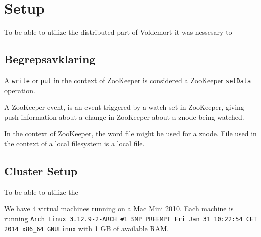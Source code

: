 \clearpage

\section{Setup}
\label{sec:setup}

To be able to utilize the distributed part of Voldemort it was nessesary to 

\subsection{Begrepsavklaring}
A \texttt{write} or \texttt{put} in the context of ZooKeeper is considered a ZooKeeper \texttt{setData} operation.

A ZooKeeper event, is an event triggered by a watch set in ZooKeeper, giving push information about a change in ZooKeeper about a znode being watched.

In the context of ZooKeeper, the word file might be used for a znode. File used in the context of a local filesystem is a local file.

\subsection{Cluster Setup}
To be able to utilize the 


We have 4 virtual machines running on a Mac Mini 2010. Each machine is running \texttt{Arch Linux 3.12.9-2-ARCH \#1 SMP PREEMPT Fri Jan 31 10:22:54 CET 2014 x86\_64 GNU\/Linux} with 1 GB of available RAM. 


